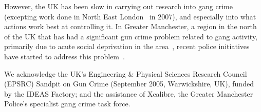 \documentclass[twocolumn]{svjour3}          %
\begin{document}
However, the UK has been slow in carrying out research into gang crime
(excepting work done in North East London~\cite{pitts:2007} in 2007),
and especially into what actions work best at controlling it. In
Greater Manchester, a region in the north of the UK that has had a
significant gun crime problem related to gang activity, primarily due
to acute social deprivation in the
area~\citep{BBCNews2003,BBCNews2004,HalesLewisSilverstone2006}, recent
police initiatives have started to address this
problem~\citep{BBCNews2010}.

\begin{acknowledgements}
We acknowledge the UK's Engineering \& Physical Sciences Research
Council (EPSRC) Sandpit on Gun Crime (September 2005, Warwickshire,
UK), funded by the IDEAS Factory; and the assistance of Xcalibre, the Greater
Manchester Police's specialist gang crime task force.
\end{acknowledgements}

\end{document}
